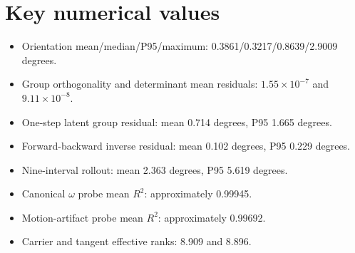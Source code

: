 \documentclass[11pt,a4paper]{article}
\begin{document}
\appendix
\section{Key numerical values}
\begin{itemize}[leftmargin=*]
\item Orientation mean/median/P95/maximum: 0.3861/0.3217/0.8639/2.9009 degrees.
\item Group orthogonality and determinant mean residuals: $1.55\times10^{-7}$ and $9.11\times10^{-8}$.
\item One-step latent group residual: mean 0.714 degrees, P95 1.665 degrees.
\item Forward-backward inverse residual: mean 0.102 degrees, P95 0.229 degrees.
\item Nine-interval rollout: mean 2.363 degrees, P95 5.619 degrees.
\item Canonical $\omega$ probe mean $R^2$: approximately 0.99945.
\item Motion-artifact probe mean $R^2$: approximately 0.99692.
\item Carrier and tangent effective ranks: 8.909 and 8.896.
\end{itemize}


\end{document}
